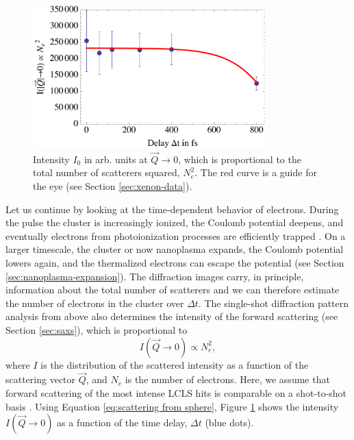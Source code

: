 \begin{figure}
	\centering
		\includegraphics[width=0.80\textwidth]{images/results/number-of-scatterers.png}
	\caption[Time-resolved behavior of number of scatterers due to nanoplasma expansion]{Intensity $I_{0}$ in arb. units at $\vec{Q}\rightarrow 0$, which is proportional to the total number of scatterers squared, $N_{e}^{2}$. The red curve is a guide for the eye (see Section \ref{sec:xenon-data}).}
	\label{fig:number-of-scatterer}
\end{figure}
%
Let us continue by looking at the time-dependent behavior of electrons. During the pulse the cluster is increasingly ionized, the Coulomb potential deepens, and eventually electrons from photoionization processes are efficiently trapped \cite{Arbeiter-2011-NJP}. On a larger timescale, the cluster or now nanoplasma expands, the Coulomb potential lowers again, and the thermalized electrons can escape the potential (see Section \ref{sec:nanoplasma-expansion}). The diffraction images carry, in principle, information about the total number of scatterers and we can therefore estimate the number of electrons in the cluster over $\Delta t$. The single-shot diffraction pattern analysis from above also determines the intensity of the forward scattering (see Section \ref{sec:saxs}), which is proportional to
\begin{equation}{}
I\left(\vec{Q}\rightarrow 0\right) \propto N_{e}^{2},
\label{eq:intensity-prop-to-electrons}
\end{equation}
where $I$ is the distribution of the scattered intensity as a function of the scattering vector $\vec{Q}$, and $N_{e}$ is the number of electrons. Here, we assume that forward scattering of the most intense LCLS hits is comparable on a shot-to-shot basis \cite{Gorkhover-2012-PRL}. Using Equation \eqref{eq:scattering from sphere}, Figure \ref{fig:number-of-scatterer} shows the intensity $I\left(\vec{Q}\rightarrow 0\right)$ as a function of the time delay, $\Delta t$ (blue dots).
